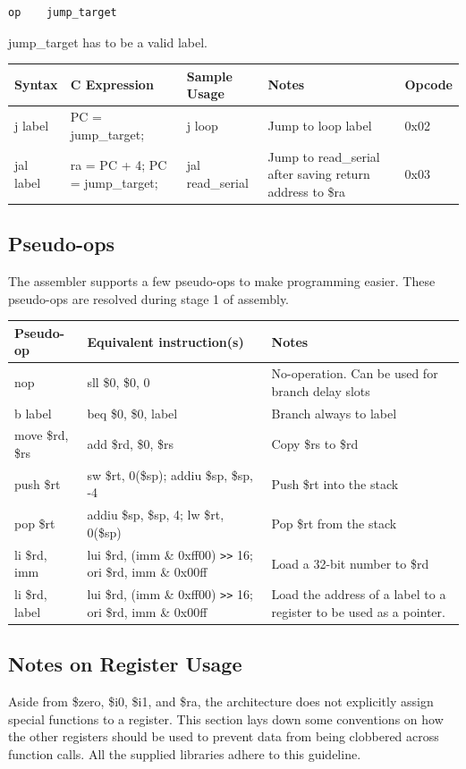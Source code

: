 \documentclass{article}
\begin{document}
\begin{verbatim}
op    jump_target
\end{verbatim}

jump\_target has to be a valid label. 

\begin{tabularx}{\linewidth}{|X|X|X|X|X|}
\hline
Syntax & C Expression & Sample Usage & Notes & Opcode \\
\hline
j label & PC = jump\_target; & j loop & Jump to loop label & 0x02 \\
jal label & ra = PC + 4; PC = jump\_target; & jal read\_serial & Jump to read\_serial after saving return address to \$ra & 0x03 \\
\hline
\end{tabularx}

\subsection{Pseudo-ops}
The assembler supports a few pseudo-ops to make programming easier. These pseudo-ops are resolved during stage 1 of assembly.

\begin{tabularx}{\linewidth}{|X|X|X|}
\hline
Pseudo-op  &  Equivalent instruction(s)  &  Notes \\
\hline
nop & sll \$0, \$0, 0 & No-operation. Can be used for branch delay slots \\
b label & beq \$0, \$0, label & Branch always to label \\
move \$rd, \$rs & add \$rd, \$0, \$rs & Copy \$rs to \$rd \\
push \$rt & sw \$rt, 0(\$sp); addiu \$sp, \$sp, -4 & Push \$rt into the stack \\
pop \$rt & addiu \$sp, \$sp, 4; lw \$rt, 0(\$sp) & Pop \$rt from the stack \\
li \$rd, imm & lui \$rd, (imm \& 0xff00) \verb+>>+ 16; ori \$rd, imm \& 0x00ff & Load a 32-bit number to \$rd \\
li \$rd, label & lui \$rd, (imm \& 0xff00) \verb+>>+ 16; ori \$rd, imm \& 0x00ff & Load the address of a label to a register to be used as a pointer. \\
\hline
\end{tabularx}

\subsection{Notes on Register Usage}
Aside from \$zero, \$i0, \$i1, and \$ra, the architecture does not explicitly assign special functions to a register. This section lays down some conventions on how the other registers should be used to prevent data from being clobbered across function calls. All the supplied libraries adhere to this guideline. 
\end{document}
